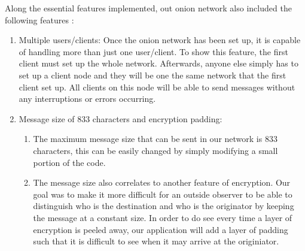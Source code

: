 \documentclass[10pt]{report}
\begin{document}
Along the essential features implemented, out onion network also included the following features :
\begin{enumerate}
    \item Multiple users/clients: Once the onion network has been set up, it is capable of handling more than just one user/client. To show this feature, the first client must set up the whole network. Afterwards, anyone else simply has to set up a client node and they will be one the same network that the first client set up. All clients on this node will be able to send messages without any interruptions or errors occurring.
    \item Message size of 833 characters and encryption padding:
    \begin{enumerate}
        \item The maximum message size that can be sent in our network is 833 characters, this can be easily changed by simply modifying a small portion of the code. 
        \item The message size also correlates to another feature of encryption. Our goal was to make it more difficult for an outside observer to be able to distinguish who is the destination and who is the originator by keeping the message at a constant size. In order to do see every time a layer of encryption is peeled away, our application will add a layer of padding such that it is difficult to see when it may arrive at the originiator.
    \end{enumerate}
\end{enumerate}
\end{document}

